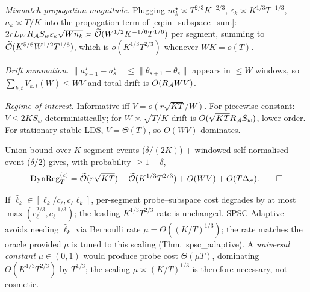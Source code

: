 \emph{Mismatch-propagation magnitude.} Plugging
$m_k^\star\asymp T^{2/3}K^{-2/3}$, $\varepsilon_k\asymp K^{1/3}T^{-1/3}$,
$n_k\asymp T/K$ into the propagation term of \eqref{eq:in_subspace_sum}:
$2rL_W R_{\mathcal{A}} S_w\varepsilon_k\sqrt{Wn_k}\asymp\widetilde{\mathcal{O}}(W^{1/2}K^{-1/6}T^{1/6})$
per segment, summing to $\widetilde{\mathcal{O}}(K^{5/6}W^{1/2}T^{1/6})$, which is
$o(K^{1/3}T^{2/3})$ whenever $WK=o(T)$.

\emph{Drift summation.}
$\|a_{s+1}^\star-a_s^\star\|\le\|\theta_{s+1}-\theta_s\|$ appears in
$\le W$ windows, so $\sum_{k,t}V_{k,t}(W)\le WV$ and total drift is
$O(R_{\mathcal{A}} W V)$.

\emph{Regime of interest.} Informative iff $V=o(r\sqrt{KT}/W)$. For
piecewise constant: $V\le 2KS_w$ deterministically; for $W\asymp\sqrt{T/K}$
drift is $O(\sqrt{KT}R_{\mathcal{A}} S_w)$, lower order. For stationary stable
LDS, $V=\Theta(T)$, so $O(WV)$ dominates.

Union bound over $K$ segment events ($\delta/(2K)$) + windowed
self-normalised event ($\delta/2$) gives, with probability $\ge 1-\delta$,
\[
\mathrm{DynReg}_T^{(c)} = \widetilde{\mathcal{O}}(r\sqrt{KT})+\widetilde{\mathcal{O}}(K^{1/3}T^{2/3})+O(WV)+O(T\Delta_\sigma).
\qedhere
\]

\begin{remark}
\label{rem:lk_misspec}
If $\widehat\ell_k\in[\ell_k/c_\ell,c_\ell\ell_k]$, per-segment
probe--subspace cost degrades by at most
$\max(c_\ell^{2/3},c_\ell^{-1/3})$; the leading $K^{1/3}T^{2/3}$
rate is unchanged. SPSC-Adaptive avoids needing $\widehat\ell_k$ via
Bernoulli rate $\mu=\Theta((K/T)^{1/3})$; the rate matches the oracle
provided $\mu$ is tuned to this scaling (Thm.~spsc\_adaptive). A
\emph{universal constant} $\mu\in(0,1)$ would produce probe cost
$\Theta(\mu T)$, dominating $\Theta(K^{1/3}T^{2/3})$ by $T^{1/3}$;
the scaling $\mu\asymp(K/T)^{1/3}$ is therefore necessary, not cosmetic.
\end{remark}


